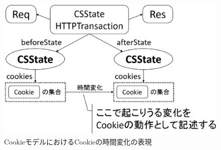 \documentclass[12pt,a4paper]{jbook}
\begin{document}
\begin{figure}[htb]
\centering
\includegraphics[width=450pt]{./fig/cookie-model-transaction.eps}
\caption{CookieモデルにおけるCookieの時間変化の表現}
\label{fig:cookie-model-transaction}
\end{figure}
\end{document}

